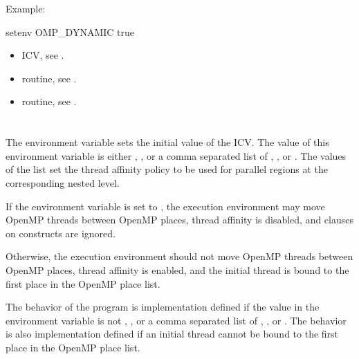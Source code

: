 Example:
\begin{boxedcode}
setenv OMP\_DYNAMIC true
\end{boxedcode}

\crossreferences
\begin{itemize}
\item {} ICV, see .

\item {} routine, see .

\item {} routine, see .
\end{itemize}









\section{}
\label{sec:OMP_PROC_BIND}
The  environment variable sets the initial value of the  ICV. 
The value of this environment variable is either , , or a comma separated 
list of , , or . The values of the list set the thread affinity policy 
to be used for parallel regions at the corresponding nested level.

If the environment variable is set to , the execution environment may move 
OpenMP threads between OpenMP places, thread affinity is disabled, and  
clauses on  constructs are ignored.

Otherwise, the execution environment should not move OpenMP threads between 
OpenMP places, thread affinity is enabled, and the initial thread is bound to the first 
place in the OpenMP place list.

The behavior of the program is implementation defined if the value in the 
 environment variable is not , , or a comma separated 
list of , , or . The behavior is also implementation defined if an 
initial thread cannot be bound to the first place in the OpenMP place list.

